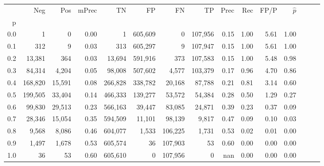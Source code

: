 \begin{tabular}{rrrrrrrrrrrrrrr}
\toprule
{} &      Neg &     Pos & mPrec &       TN &       FP &       FN &       TP &  Prec &   Rec &  FP/P & $\hat{p}$ \\
p   &          &         &       &          &          &          &          &       &       &       &           \\
\midrule
0.0 &        1 &       0 &  0.00 &        1 &  605,609 &        0 &  107,956 &  0.15 &  1.00 &  5.61 &      1.00 \\
0.1 &      312 &       9 &  0.03 &      313 &  605,297 &        9 &  107,947 &  0.15 &  1.00 &  5.61 &      1.00 \\
0.2 &   13,381 &     364 &  0.03 &   13,694 &  591,916 &      373 &  107,583 &  0.15 &  1.00 &  5.48 &      0.98 \\
0.3 &   84,314 &   4,204 &  0.05 &   98,008 &  507,602 &    4,577 &  103,379 &  0.17 &  0.96 &  4.70 &      0.86 \\
0.4 &  168,820 &  15,591 &  0.08 &  266,828 &  338,782 &   20,168 &   87,788 &  0.21 &  0.81 &  3.14 &      0.60 \\
0.5 &  199,505 &  33,404 &  0.14 &  466,333 &  139,277 &   53,572 &   54,384 &  0.28 &  0.50 &  1.29 &      0.27 \\
0.6 &   99,830 &  29,513 &  0.23 &  566,163 &   39,447 &   83,085 &   24,871 &  0.39 &  0.23 &  0.37 &      0.09 \\
0.7 &   28,346 &  15,054 &  0.35 &  594,509 &   11,101 &   98,139 &    9,817 &  0.47 &  0.09 &  0.10 &      0.03 \\
0.8 &    9,568 &   8,086 &  0.46 &  604,077 &    1,533 &  106,225 &    1,731 &  0.53 &  0.02 &  0.01 &      0.00 \\
0.9 &    1,497 &   1,678 &  0.53 &  605,574 &       36 &  107,903 &       53 &  0.60 &  0.00 &  0.00 &      0.00 \\
1.0 &       36 &      53 &  0.60 &  605,610 &        0 &  107,956 &        0 &   nan &  0.00 &  0.00 &      0.00 \\
\bottomrule
\end{tabular}
